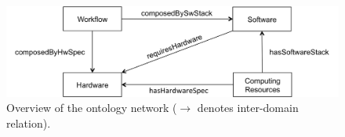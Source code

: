 \begin{figure}[!htb]
	\centering
    \includegraphics[width=\linewidth]{figures/wicusrels}
    \caption{Overview of the ontology network ($\rightarrow$ denotes inter-domain relation).}
    \label{fig:wicusrels}
\end{figure}
